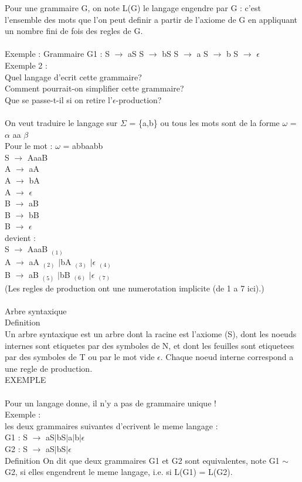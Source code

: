 \documentclass[5pt]{article}
\begin{document}
\begin{scriptsize}
Pour une grammaire G, on note L(G) le langage engendre par G : c’est l’ensemble des mots que l’on peut definir a partir de l’axiome de G en appliquant un nombre fini de fois des regles de G.\\
\\
Exemple : Grammaire G1 : S $\rightarrow$ aS S $\rightarrow$ bS S $\rightarrow$ a S $\rightarrow$ b S $\rightarrow$ $\epsilon$\\
Exemple 2 :\\
Quel langage d'ecrit cette grammaire?\\Comment pourrait-on simplifier cette grammaire?\\Que se passe-t-il si on retire l’$\epsilon$-production?\\
\\
On veut traduire le langage sur $\Sigma$ = \{a,b\} ou tous les mots sont de la forme $\omega$ = $\alpha$ aa $\beta$\\
Pour le mot : $\omega$ = abbaabb\\
S $\rightarrow$ AaaB\\
A $\rightarrow$ aA\\
A $\rightarrow$ bA\\
A $\rightarrow$ $\epsilon$\\
B $\rightarrow$ aB\\
B $\rightarrow$ bB\\
B $\rightarrow$ $\epsilon$\\
devient :\\
S $\rightarrow$ AaaB $_{(1)}$\\
A $\rightarrow$ aA $_{(2)}$ $\mid$bA $_{(3)}$ $\mid\epsilon$ $_{(4)}$\\
B $\rightarrow$ aB $_{(5)}$ $\mid$bB $_{(6)}$ $\mid\epsilon$ $_{(7)}$\\
(Les regles de production ont une numerotation implicite (de 1 a 7 ici).)\\
\\
Arbre syntaxique\\
Definition\\
Un arbre syntaxique est un arbre dont la racine est l’axiome (S), dont les noeuds internes sont etiquetes par des symboles de N, et dont les feuilles sont etiquetees par des symboles de T ou par le mot vide $\epsilon$. Chaque noeud interne correspond a une regle de production.
\\
EXEMPLE\\
\\
Pour un langage donne, il n’y a pas de grammaire unique ! \\
Exemple :\\
les deux grammaires suivantes d'ecrivent le meme langage :\\
G1 : S $\rightarrow$ aS$\mid$bS$\mid$a$\mid$b$\mid\epsilon$\\
G2 : S $\rightarrow$ aS$\mid$bS$\mid\epsilon$\\
Definition On dit que deux grammaires G1 et G2 sont equivalentes, note G1 $\sim$ G2, si elles engendrent le meme langage, i.e. si L(G1) = L(G2).\\

\end{scriptsize}
\end{document}
